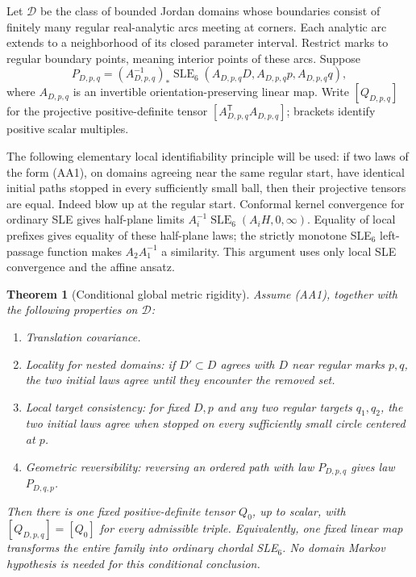 \documentclass[11pt]{article}
\newtheorem{theorem}{Theorem}[section]
\theoremstyle{definition}\newtheorem{definition}[theorem]{Definition}
\theoremstyle{remark}\newtheorem{remark}[theorem]{Remark}
\begin{document}
Let $\mathcal D$ be the class of bounded Jordan domains whose boundaries
consist of finitely many regular real-analytic arcs meeting at corners.
Each analytic arc extends to a neighborhood of its closed parameter interval.
Restrict marks to regular boundary points, meaning interior points of these
arcs. Suppose
\[
 P_{D,p,q}=(A_{D,p,q}^{-1})_*\operatorname{SLE}_6
 (A_{D,p,q}D,A_{D,p,q}p,A_{D,p,q}q),
 \tag{AA1}
\]
where $A_{D,p,q}$ is an invertible orientation-preserving linear map. Write
$[Q_{D,p,q}]$ for the projective positive-definite tensor
$[A_{D,p,q}^{\mathsf T}A_{D,p,q}]$; brackets identify positive scalar multiples.

The following elementary local identifiability principle will be used:
if two laws of the form (AA1), on domains agreeing near the same regular
start, have identical initial paths stopped in every sufficiently small ball,
then their projective tensors are equal. Indeed blow up at the regular start.
Conformal kernel convergence for ordinary SLE gives half-plane limits
$A_i^{-1}\operatorname{SLE}_6(A_iH,0,\infty)$. Equality of local prefixes
gives equality of these half-plane laws; the strictly monotone SLE$_6$
left-passage function makes $A_2A_1^{-1}$ a similarity. This argument uses
only local SLE convergence and the affine ansatz.

\begin{theorem}[Conditional global metric rigidity]
\label{thm:aa-global}
Assume (AA1), together with the following properties on $\mathcal D$:
\begin{enumerate}
\item \emph{Translation covariance.}
\item \emph{Locality for nested domains}: if $D'\subset D$ agrees with $D$
near regular marks $p,q$, the two initial laws agree until they encounter the
removed set.
\item \emph{Local target consistency}: for fixed $D,p$ and any two regular
targets $q_1,q_2$, the two initial laws agree when stopped on every
sufficiently small circle centered at $p$.
\item \emph{Geometric reversibility}: reversing an ordered path with law
$P_{D,p,q}$ gives law $P_{D,q,p}$.
\end{enumerate}
Then there is one fixed positive-definite tensor $Q_0$, up to scalar, with
$[Q_{D,p,q}]=[Q_0]$ for every admissible triple. Equivalently, one fixed
linear map transforms the entire family into ordinary chordal SLE$_6$.
No domain Markov hypothesis is needed for this conditional conclusion.
\end{theorem}
\end{document}
